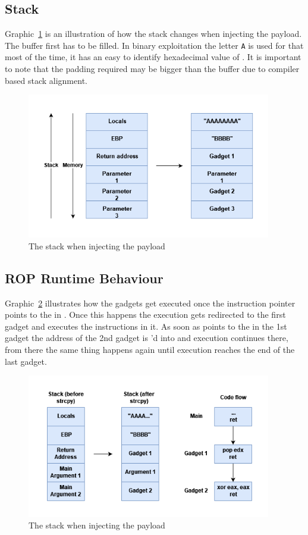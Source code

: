 \documentclass[journal=tosc,submission, notanonymous]{iacrtrans}
\begin{document}
\subsection{Stack}
Graphic~\cref{fig:stack} is an illustration of how the stack changes when injecting the payload. The buffer first has to be filled. In binary exploitation the letter \Verb+A+ is used for that most of the time, it has an easy to identify hexadecimal value of . It is important to note that the padding required may be bigger than the buffer due to compiler based stack alignment.
\begin{figure}[H]
  \centering
  \includegraphics[width=0.95\textwidth]{stackropoffsec.png}
  \caption{The stack when injecting the payload}
  \label{fig:stack}
\end{figure}
\subsection{ROP Runtime Behaviour}
Graphic~\cref{fig:executionatruntime} illustrates how the gadgets get executed once the instruction pointer  points to the  in . Once this happens the execution gets redirected to the first gadget and executes the instructions in it. As soon as  points to the  in the 1st gadget the address of the 2nd gadget is 'd into  and execution continues there, from there the same thing happens again until execution reaches the end of the last gadget.
\begin{figure}[H]
  \centering
  \includegraphics[width=0.95\textwidth]{Ropchaineffect.png}
  \caption{The stack when injecting the payload}
  \label{fig:executionatruntime}
\end{figure}
\end{document}
